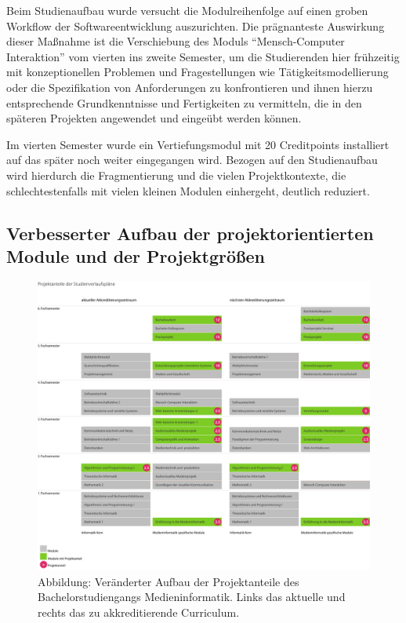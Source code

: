 Beim Studienaufbau wurde versucht die Modulreihenfolge auf einen groben
Workflow der Softwareentwicklung auszurichten. Die prägnanteste
Auswirkung dieser Maßnahme ist die Verschiebung des Moduls
``Mensch-Computer Interaktion'' vom vierten ins zweite Semester, um die
Studierenden hier frühzeitig mit konzeptionellen Problemen und
Fragestellungen wie Tätigkeitsmodellierung oder die Spezifikation von
Anforderungen zu konfrontieren und ihnen hierzu entsprechende
Grundkenntnisse und Fertigkeiten zu vermitteln, die in den späteren
Projekten angewendet und eingeübt werden können.

Im vierten Semester wurde ein Vertiefungsmodul mit 20 Creditpoints
installiert auf das später noch weiter eingegangen wird. Bezogen auf den
Studienaufbau wird hierdurch die Fragmentierung und die vielen
Projektkontexte, die schlechtestenfalls mit vielen kleinen Modulen
einhergeht, deutlich reduziert.

\subsection{Verbesserter Aufbau der projektorientierten Module und
der
Projektgrößen}\label{verbesserter-aufbau-der-projektorientierten-module-und-der-projektgruxf6uxdfen}

\begin{figure}[htbp][htbp]
\centering
\includegraphics[width=\columnwidth]{../anhaenge/bilder/ba-projektanteile.png}
\caption{Abbildung: Veränderter Aufbau der Projektanteile des
Bachelorstudiengangs Medieninformatik. Links das aktuelle und rechts das
zu akkreditierende Curriculum.}
\end{figure}


